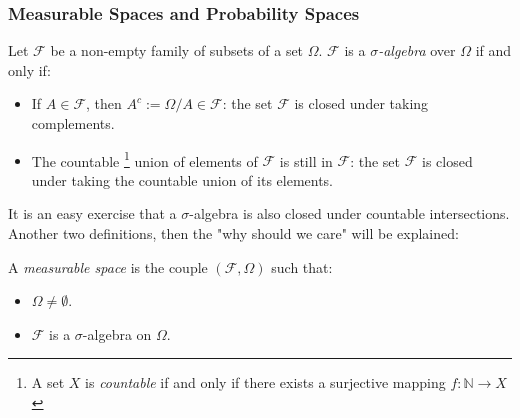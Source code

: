                         \subsubsection{Measurable Spaces and Probability Spaces}
                            \begin{definition}\label{sigma_algebra}
                                Let $\mathcal{F}$ be a non-empty family of subsets of a set $\Omega$. $\mathcal{F}$ is a $\sigma$\textit{-algebra} over $\Omega$ if and only if:
                                \begin{itemize}
                                    \item If $A \in \mathcal{F}$, then $A^c:=\Omega/A\in\mathcal{F}$: the set $\mathcal{F}$ is closed under taking complements.
                                    \item The countable \footnote{A set $X$ is \textit{countable} if and only if there exists a surjective mapping $f:\mathbb{N}\rightarrow X$} union of elements of $\mathcal{F}$ is still in $\mathcal{F}$: the set $\mathcal{F}$ is closed under taking the countable union of its elements.
                                \end{itemize}
                            \end{definition}
                            It is an easy exercise that a $\sigma$-algebra is also closed under countable intersections. Another two definitions, then the "why should we care" will be explained:
                            \begin{definition}\label{measurable_space}
                                A \textit{measurable space} is the couple $\left(\mathcal{F},\Omega\right)$ such that:
                                \begin{itemize}
                                    \item $\Omega\neq\emptyset$.
                                    \item $\mathcal{F}$ is a $\sigma$-algebra on $\Omega$.
                                \end{itemize}
                            \end{definition}
